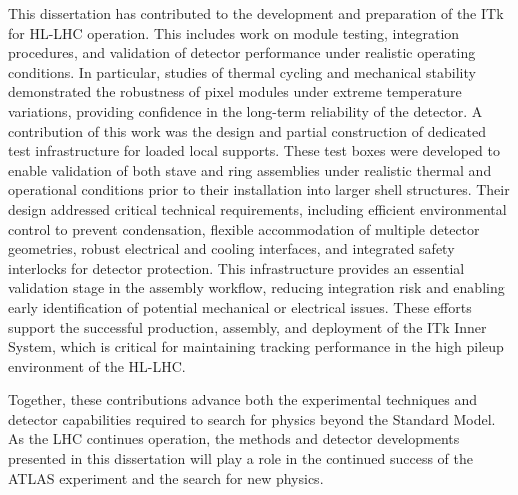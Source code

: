This dissertation has contributed to the development and preparation of the ITk for HL-LHC operation. This includes work on module testing, integration procedures, and validation of detector performance under realistic operating conditions. In particular, studies of thermal cycling and mechanical stability demonstrated the robustness of pixel modules under extreme temperature variations, providing confidence in the long-term reliability of the detector. 
A contribution of this work was the design and partial construction of dedicated test infrastructure for loaded local supports. These test boxes were developed to enable validation of both stave and ring assemblies under realistic thermal and operational conditions prior to their installation into larger shell structures. Their design addressed critical technical requirements, including efficient environmental control to prevent condensation, flexible accommodation of multiple detector geometries, robust electrical and cooling interfaces, and integrated safety interlocks for detector protection. This infrastructure provides an essential validation stage in the assembly workflow, reducing integration risk and enabling early identification of potential mechanical or electrical issues.
These efforts support the successful production, assembly, and deployment of the ITk Inner System, which is critical for maintaining tracking performance in the high pileup environment of the HL-LHC.

Together, these contributions advance both the experimental techniques and detector capabilities required to search for physics beyond the Standard Model. As the LHC continues operation, the methods and detector developments presented in this dissertation will play a role in the continued success of the ATLAS experiment and the search for new physics.

